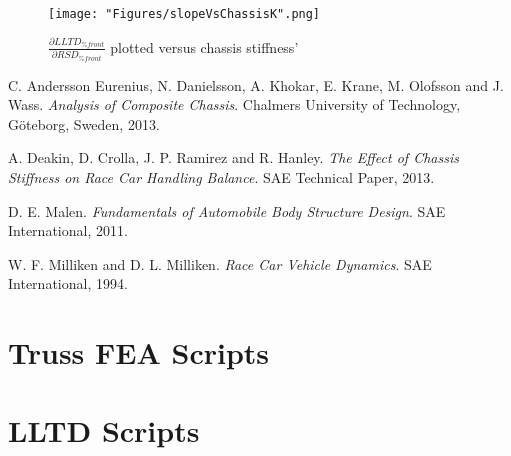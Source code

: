 \documentclass[a4paper]{article}
\numberwithin{equation}{section}
\begin{document}

\begin{figure}[h]
	\begin{center}
		\texttt{[image: "Figures/slopeVsChassisK".png]}
	\end{center}
	
	\caption{$\frac{\partial LLTD_{\% front}}{\partial RSD_{\% front}}$ plotted versus chassis stiffness'}
	\label{fig: slopeVsChassisK}
\end{figure}

\newpage
\begin{thebibliography}{9}
	C. Andersson Eurenius, N. Danielsson, A. Khokar, E. Krane, M. Olofsson and J. Wass.
	\textit{Analysis of Composite Chassis}.
	Chalmers University of Technology, Göteborg, Sweden, 2013.
	
	A. Deakin, D. Crolla, J. P. Ramirez and R. Hanley.
	\textit{The Effect of Chassis Stiffness on Race Car Handling Balance}.
	SAE Technical Paper, 2013.
	
	D. E. Malen.
	\textit{Fundamentals of Automobile Body Structure Design}.
	SAE International, 2011. 
	
	W. F. Milliken and D. L. Milliken.
	\textit{Race Car Vehicle Dynamics}.
	SAE International, 1994. 
	
	\label{References}
\end{thebibliography}

\begin{appendices}
	\section{Truss FEA Scripts} \label{FEA Scripts}
	
	\section{LLTD Scripts} \label{LLTD Scripts}
\end{appendices}
\end{document}
